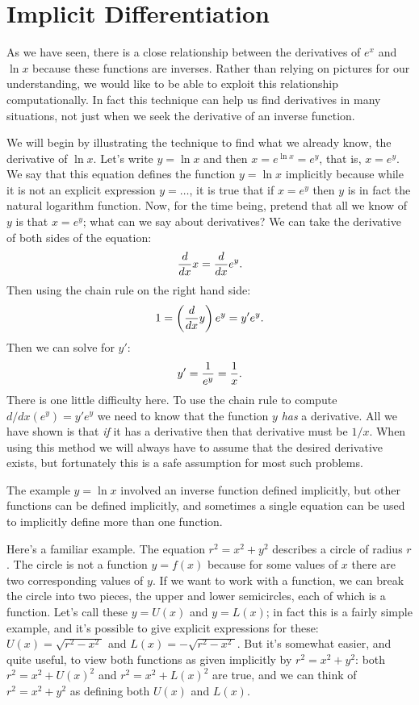 \section{Implicit Differentiation}



As we have seen, there is a close relationship between the derivatives
of $e^x$ and $\ln x$ because these functions are inverses. Rather
than relying on pictures for our understanding, we would like to be
able to exploit this relationship computationally.  In fact this
technique can help us find derivatives in many situations, not just
when we seek the derivative of an inverse function.

We will begin by illustrating the technique to find what we already
know, the derivative of $\ln x$. Let's write $y=\ln x$ and then $
x=e^{\ln x}=e^y$, that is, $x=e^y$. We say that this equation
defines the function $y=\ln x$ implicitly because while it is not an
explicit expression $y=\ldots$, it is true that if $x=e^y$ then
$y$ is in fact the natural logarithm function. Now, for the time
being, pretend that all we know of $y$ is that $x=e^y$; what can
we say about derivatives? We can take the derivative of both sides of
the equation:
$${d\over dx}x={d\over dx}e^y.$$
Then using the chain rule on the right hand side:
$$1 = \left({d\over dx}y\right) e^y = y'e^y.$$
Then we can solve for $y'$:
$$y'={1\over e^y} = {1\over x}.$$
There is one little difficulty here. To use the chain rule to compute 
$d/dx(e^y)=y'e^y$ we need to know that the function $y$ {\it has\/} a
derivative. All we have shown is that {\it if\/} it has a derivative
then that derivative must be $1/x$. When using this method we will
always have to assume that the desired derivative exists, but
fortunately this is a safe assumption for most such problems. 

The example $y=\ln x$ involved an inverse function defined implicitly,
but other functions can be defined implicitly, and sometimes a single
equation can be used to implicitly define more than one
function. 

Here's a familiar example. The equation $r^2=x^2+y^2$
describes a circle of radius $r$. The circle is not a function
$y=f(x)$ because for some values of $x$ there are two corresponding
values of $y$. If we want to work with a function, we can break the
circle into two pieces, the upper and lower semicircles, each of which
is a function. Let's call these $y=U(x)$ and $y=L(x)$; in fact this is
a fairly simple example, and it's possible to give explicit
expressions for these: $U(x)=\sqrt{r^2-x^2\ }$ and
$L(x)=-\sqrt{r^2-x^2\ }$.  But it's somewhat easier, and quite useful,
to view both functions as given implicitly by $r^2=x^2+y^2$: both
$r^2=x^2+U(x)^2$ and $r^2=x^2+L(x)^2$ are true, and we can think of 
$r^2=x^2+y^2$ as defining both $U(x)$ and $L(x)$.

